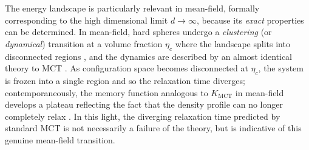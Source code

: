 \documentclass[11pt,twoside]{report}
\begin{document}
The energy landscape is particularly relevant in mean-field, formally corresponding to the high dimensional limit%
$d \to \infty$, because its \emph{exact} properties can be determined.
In mean-field, hard spheres undergo a \emph{clustering} (or \emph{dynamical}) transition at a volume fraction $\eta_c$ where the landscape splits into disconnected regions \cite{ParisiRMP2010,KurchanJSM2012,KurchanJSM2016}, and the dynamics are described by an almost identical theory to MCT \cite{MaimbourgPRL2016,KurchanJSM2016}.
As configuration space becomes disconnected at $\eta_c$, the system is frozen into a single region and so the relaxation time diverges; contemporaneously, the memory function analogous to $K_\mathrm{MCT}$ in mean-field develops a plateau reflecting the fact that the density profile can no longer completely relax \cite{CharbonneauARCMP2017}.
In this light, the diverging relaxation time predicted by standard MCT is not necessarily a failure of the theory, but is indicative of this genuine mean-field transition.
\end{document}
